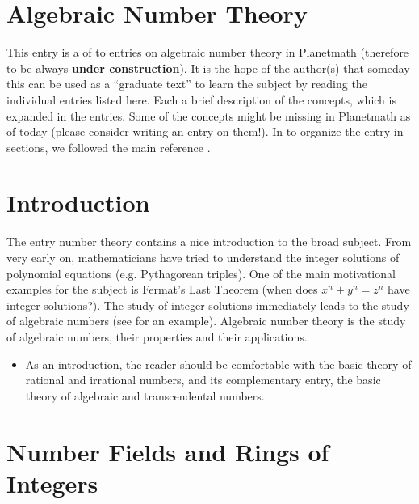 \documentclass[12pt]{article}
\begin{document}
\section*{Algebraic Number Theory}

This entry is a  of  to entries on algebraic number theory in Planetmath (therefore  to be always {\bf under construction}). It is the hope of the author(s) that someday this can be used as a ``graduate text'' to learn the subject by reading the individual entries listed here. Each   a brief description of the concepts, which is expanded in the entries. Some of the concepts might be missing in Planetmath as of today (please consider writing an entry on them!). In  to organize the entry in sections, we followed the main reference \cite{marcus}.  

\section{Introduction}

The entry number theory contains a nice introduction to the broad subject. From very early on, mathematicians have tried to understand the integer solutions of polynomial equations (e.g. Pythagorean triples). One of the main motivational examples for the subject is Fermat's Last Theorem (when does $x^n+y^n=z^n$ have integer solutions?). The study of integer solutions immediately leads to the study of algebraic numbers (see  for an example). Algebraic number theory is the study of algebraic numbers, their properties and their applications.

\begin{itemize}
\item As an introduction, the reader should be comfortable with the basic theory of rational and irrational numbers, and its complementary entry, the basic theory of algebraic and transcendental numbers.
\end{itemize}

\section{Number Fields and Rings of Integers}
\end{document}
